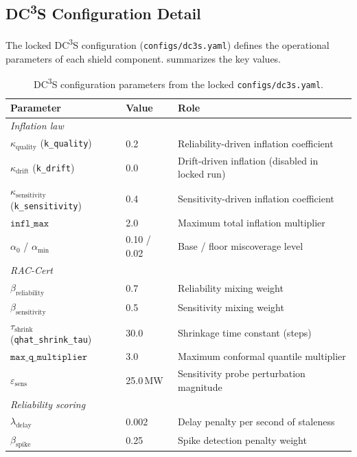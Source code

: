 \documentclass[11pt,a4paper]{article}
\DeclareRobustCommand{\DCThreeS}{DC\textsuperscript{3}S}
\begin{document}
\subsection{DC\textsuperscript{3}S Configuration Detail}\label{sec:dc3s_config}

The locked DC\textsuperscript{3}S configuration (\texttt{configs/dc3s.yaml}) defines the operational parameters of each shield component.   summarizes the key values.

\begin{table}[htbp]
\centering\small
\caption{\DCThreeS{} configuration parameters from the locked \texttt{configs/dc3s.yaml}.}
\label{tab:dc3s_config}
\begin{tabular}{p{3.8cm}p{1.5cm}p{7.2cm}}
\toprule
Parameter & Value & Role \\
\midrule
\multicolumn{3}{l}{\textit{Inflation law}} \\
\quad $\kappa_{\text{quality}}$ (\texttt{k\_quality}) & 0.2 & Reliability-driven inflation coefficient \\
\quad $\kappa_{\text{drift}}$ (\texttt{k\_drift}) & 0.0 & Drift-driven inflation (disabled in locked run) \\
\quad $\kappa_{\text{sensitivity}}$ (\texttt{k\_sensitivity}) & 0.4 & Sensitivity-driven inflation coefficient \\
\quad $\texttt{infl\_max}$ & 2.0 & Maximum total inflation multiplier \\
\quad $\alpha_0$ / $\alpha_{\min}$ & 0.10 / 0.02 & Base / floor miscoverage level \\
\midrule
\multicolumn{3}{l}{\textit{RAC-Cert}} \\
\quad $\beta_{\text{reliability}}$ & 0.7 & Reliability mixing weight \\
\quad $\beta_{\text{sensitivity}}$ & 0.5 & Sensitivity mixing weight \\
\quad $\tau_{\text{shrink}}$ (\texttt{qhat\_shrink\_tau}) & 30.0 & Shrinkage time constant (steps) \\
\quad $\texttt{max\_q\_multiplier}$ & 3.0 & Maximum conformal quantile multiplier \\
\quad $\varepsilon_{\text{sens}}$ & 25.0\,MW & Sensitivity probe perturbation magnitude \\
\midrule
\multicolumn{3}{l}{\textit{Reliability scoring}} \\
\quad $\lambda_{\text{delay}}$ & 0.002 & Delay penalty per second of staleness \\
\quad $\beta_{\text{spike}}$ & 0.25 & Spike detection penalty weight \\

\end{tabular}
\end{table}
\end{document}
